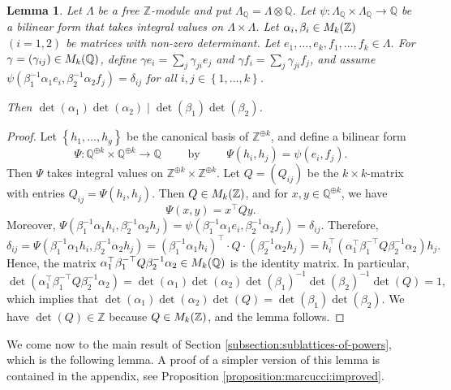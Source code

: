 \documentclass[a4paper,11pt,reqno]{amsart}
\numberwithin{equation}{section}
\theoremstyle{plain}
\newtheorem{lemma}[theorem]{Lemma}
\theoremstyle{definition}
\newcommand{\Z}{\mathbb Z}
\newcommand{\Q}{\mathbb Q}
\let\rm\relax
\newcommand{\rm}[1]{{\mathrm{#1}}}
\newcommand{\set}[1]{\left\{ #1 \right\}}
\begin{document}
\begin{lemma} \label{lemma:linearalgebra:determinantsdivision}
    Let $\Lambda$ be a free $\Z$-module and put $\Lambda_\Q = \Lambda \otimes \Q$. 
    Let $\psi \colon \Lambda_\Q \times \Lambda_\Q \to \Q$ be a bilinear form that takes integral values on $\Lambda \times \Lambda$. 
    Let $\alpha_i, \beta_i \in \rm{M}_k(\Z)$ $(i = 1,2)$ be matrices with non-zero determinant. Let $e_1, \dotsc, e_k, f_1, \dotsc, f_k \in \Lambda$. For $\gamma = (\gamma_{ij}) \in \rm{M}_k(\Q)$, define $\gamma e_i = \sum_{j} \gamma_{ji}e_j$ and $\gamma f_i = \sum_{j} \gamma_{ji} f_j$, and assume $\psi(\beta^{-1}_1\alpha_1 e_i, \beta_2^{-1}\alpha_2 f_j) = \delta_{ij}$ for all $i,j \in \set{1,\dotsc, k}$. 
    
    Then $\det(\alpha_1)\det(\alpha_2) \mid \det(\beta_1)\det(\beta_2)$. 
\end{lemma}

\begin{proof}
    Let $\set{h_1, \dotsc, h_g}$ be the canonical basis of $\Z^{\oplus k}$, and define a bilinear form 
\[
\Psi \colon \Q^{\oplus k} \times \Q^{\oplus k} \to \Q \quad \quad  \text{ by } \quad\quad   \Psi(h_i, h_j) = \psi(e_i, f_j).  
\]
Then $\Psi$ takes integral values on $\Z^{\oplus k} \times \Z^{\oplus k}$. Let $Q = (Q_{ij})$ be the $k \times k$-matrix with entries $Q_{ij} = \Psi(h_i,h_j)$. Then $Q \in \rm{M}_k(\Z)$, and for $x,y \in \Q^{\oplus k}$, we have
\[
\Psi(x,y) = x^\top Q y. 
\]
Moreover, $\Psi( \beta^{-1}_1 \alpha_1 h_i, \beta_2^{-1}\alpha_2 h_j) = \psi(\beta^{-1}_1\alpha_1 e_i, \beta_2^{-1}\alpha_2 f_j) = \delta_{ij}$. Therefore,
\[
\delta_{ij} = 
\Psi( \beta^{-1}_1 \alpha_1 h_i, \beta_2^{-1}\alpha_2 h_j) = 
(\beta^{-1}_1\alpha_1 h_i)^\top \cdot Q  \cdot (\beta_2^{-1}\alpha_2 h_j) = 
h_i^\top \left( \alpha_1^\top \beta_1^{-\top} Q \beta_2^{-1}\alpha_2 \right) h_j. 
\]
Hence, the matrix $\alpha_1^\top \beta_1^{-\top} Q \beta_2^{-1}\alpha_2\in \rm{M}_k(\Q)$ is the identity matrix. In particular, 
\[
\det(\alpha_1^\top \beta_1^{-\top} Q \beta_2^{-1}\alpha_2) = \det(\alpha_1)\det(\alpha_2)\det(\beta_1)^{-1}\det(\beta_2)^{-1}\det(Q) = 1,
\]
which implies that 
$
\det(\alpha_1)\det(\alpha_2) \det(Q) = \det(\beta_1)\det(\beta_2)$. We have $\det(Q) \in \Z$ because $Q \in \rm{M}_k(\Z)$, and the lemma follows. 
\end{proof}

We come now to the main result of Section \ref{subsection:sublattices-of-powers}, which is the following lemma. 
A proof of a simpler version of this lemma is contained in the appendix, 
see Proposition \ref{proposition:marcucci:improved}. 
\end{document}
